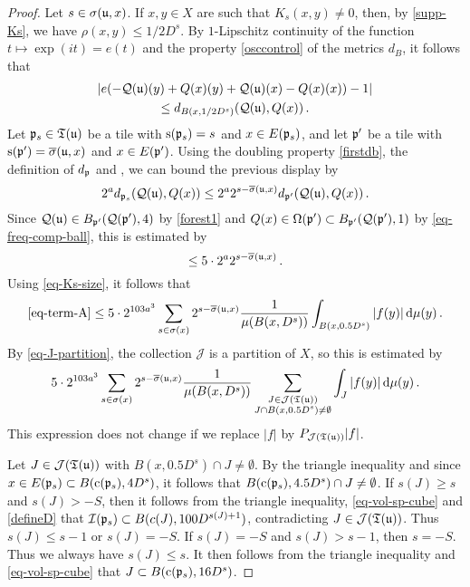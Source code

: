 \begin{proof}
    Let $s \in \sigma({\mathfrak u},x)$.
    If $x, y \in X$ are such that $K_s(x,y)\neq 0$, then, by \eqref{supp-Ks}, we have $\rho(x,y)\leq 1/2 D^s$. By $1$-Lipschitz continuity of the function $t \mapsto \exp(it) = e(t)$ and the property \eqref{osccontrol} of the metrics $d_B$, it follows that
    \begin{multline*}
        |e(-{\mathcal{Q}}({\mathfrak u})(y)+{Q}(x)(y)+{\mathcal{Q}}({\mathfrak u})(x)-{Q}(x)(x))-1|\\
        \leq d_{B(x, 1/2 D^{s})}({\mathcal{Q}}({\mathfrak u}), {Q}(x))\,.
    \end{multline*}
    Let ${\mathfrak p}_s \in {\mathfrak T}({\mathfrak u})$ be a tile with ${\mathrm{s}}({\mathfrak p}_s) = s$ and $x \in E({\mathfrak p}_s)$, and let ${\mathfrak p}'$ be a tile with ${\mathrm{s}}({\mathfrak p}') = \overline{\sigma}({\mathfrak u}, x)$ and $x \in E({\mathfrak p}')$.
    Using the doubling property \eqref{firstdb}, the definition of $d_{{\mathfrak p}}$ and , we can bound the previous display by
    $$
        2^a d_{{\mathfrak p}_s}({\mathcal{Q}}({\mathfrak u}), {Q}(x)) \le 2^{a} 2^{s - \overline{\sigma}({\mathfrak u}, x)} d_{{\mathfrak p}'}({\mathcal{Q}}({\mathfrak u}), {Q}(x))\,.
    $$
    Since ${\mathcal{Q}}({\mathfrak u}) \in B_{{\mathfrak p}'}({\mathcal{Q}}({\mathfrak p}'), 4)$ by \eqref{forest1} and ${Q}(x) \in \Omega({\mathfrak p}') \subset B_{{\mathfrak p}'}({\mathcal{Q}}({\mathfrak p}'), 1)$ by \eqref{eq-freq-comp-ball}, this is estimated by
    $$
        \le 5 \cdot 2^{a} 2^{s - \overline{\sigma}({\mathfrak u}, x)} \,.
    $$
    Using \eqref{eq-Ks-size}, it follows that
    $$
        \eqref{eq-term-A} \le 5\cdot 2^{103a^3} \sum_{s\in\sigma(x)}2^{s - \overline{\sigma}({\mathfrak u}, x)} \frac{1}{\mu(B(x,D^s))}\int_{B(x,0.5D^{s})}|f(y)|\,\mathrm{d}\mu(y)\,.
    $$
    By \eqref{eq-J-partition}, the collection $\mathcal{J}$ is a partition of $X$, so this is estimated by
    $$
         5\cdot 2^{103a^3} \sum_{s\in\sigma(x)}2^{s - \overline{\sigma}({\mathfrak u}, x)} \frac{1}{\mu(B(x,D^s))}\sum_{\substack{J \in \mathcal{J}({\mathfrak T}({\mathfrak u}))\\J \cap B(x, 0.5D^s) \ne \emptyset} }\int_{J}|f(y)|\,\mathrm{d}\mu(y)\,.
    $$
    This expression does not change if we replace $|f|$ by $P_{\mathcal{J}({\mathfrak T}({\mathfrak u}))}|f|$.

    Let $J \in \mathcal{J}({\mathfrak T}({\mathfrak u}))$ with $B(x, 0.5 D^s) \cap J \ne \emptyset$. By the triangle inequality and since $x \in E({\mathfrak p}_s) \subset B({\mathrm{c}}({\mathfrak p}_s), 4D^{s})$, it follows that $B({\mathrm{c}}({\mathfrak p}_s), 4.5D^s) \cap J \ne \emptyset$. If $s(J) \ge s$ and $s(J) > -S$, then it follows from the triangle inequality, \eqref{eq-vol-sp-cube} and \eqref{defineD} that ${\mathcal{I}}({\mathfrak p}_s) \subset B(c(J), 100 D^{s(J)+1})$, contradicting $J \in \mathcal{J}(\mathfrak{T}({\mathfrak u}))$. Thus $s(J) \le s - 1$ or $s(J) = -S$. If $s(J) = -S$ and $s(J) > s - 1$, then $s = -S$. Thus we always have $s(J) \le s$. It then follows from the triangle inequality and \eqref{eq-vol-sp-cube} that $J \subset B({\mathrm{c}}({\mathfrak p}_s), 16 D^s)$.


\end{proof}
